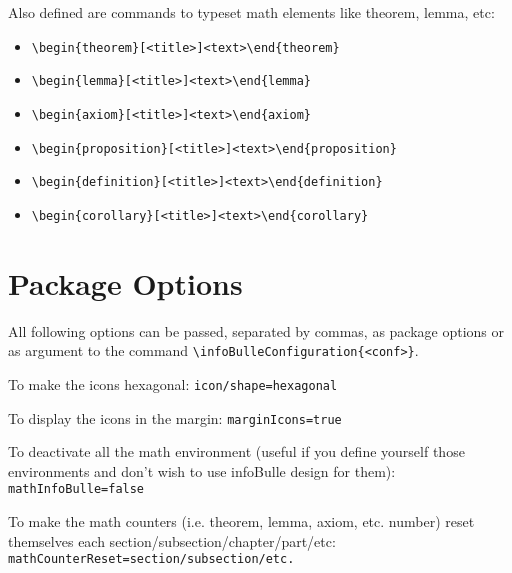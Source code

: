 \documentclass[a4paper, 11pt, oneside, fleqn]{article}
\begin{document}
Also defined are commands to typeset math elements like theorem, lemma, etc:
\begin{itemize}
	\item \verb|\begin{theorem}[<title>]<text>\end{theorem}|
	\item \verb|\begin{lemma}[<title>]<text>\end{lemma}|
	\item \verb|\begin{axiom}[<title>]<text>\end{axiom}|
	\item \verb|\begin{proposition}[<title>]<text>\end{proposition}|
	\item \verb|\begin{definition}[<title>]<text>\end{definition}|
	\item \verb|\begin{corollary}[<title>]<text>\end{corollary}|
\end{itemize}

\section{Package Options}
All following options can be passed, separated by commas, as package options or as argument to the command \verb|\infoBulleConfiguration{<conf>}|.

To make the icons hexagonal: \verb|icon/shape=hexagonal|

To display the icons in the margin: \verb|marginIcons=true|

To deactivate all the math environment (useful if you define yourself those environments and don't wish to use infoBulle design for them): \verb|mathInfoBulle=false|

To make the math counters (i.e. theorem, lemma, axiom, etc. number) reset themselves each section/subsection/chapter/part/etc: \verb|mathCounterReset=section/subsection/etc.|
\end{document}
